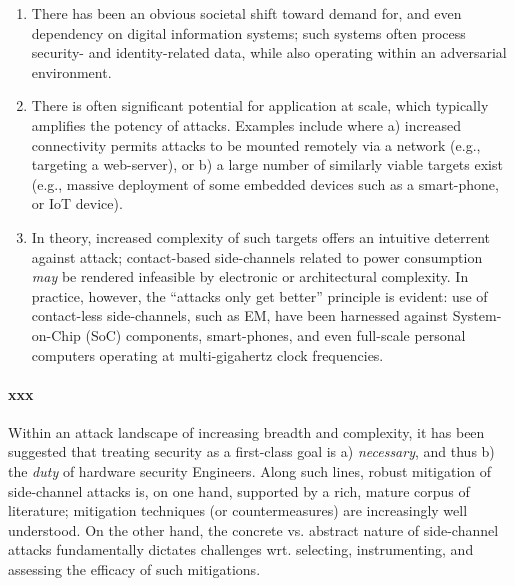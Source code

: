 \begin{enumerate}

\item There has been an obvious societal shift toward demand for, and even
      dependency on digital information systems; such systems often process
      security- and identity-related data, while also operating within an
      adversarial environment.

\item There is often significant potential for application at scale, which
      typically amplifies the potency of attacks.  Examples include where
      a) increased connectivity permits attacks to be mounted remotely via
         a network (e.g., targeting a web-server),
         or
      b) a large number of similarly viable targets exist (e.g., massive
         deployment of some embedded devices such as a smart-phone, or IoT
         device).

\item In   theory,
      increased complexity   of      such targets
      offers an intuitive deterrent against attack;
      contact-based side-channels related to power consumption {\em may} be
      rendered infeasible by electronic or architectural complexity.
      In practice,
      however, the ``attacks only get better'' principle is evident: use of
      contact-less side-channels, such as EM, have been harnessed against
      System-on-Chip (SoC) components, 
      smart-phones,
      and even
      full-scale personal computers
      operating at multi-gigahertz clock frequencies.

\end{enumerate}


\paragraph{xxx}

Within an attack landscape of increasing breadth and complexity, it has been
suggested that treating security as a first-class goal is
a) {\em necessary},
   and thus
b) the {\em duty} of hardware security Engineers.
Along such lines, robust mitigation of side-channel attacks is, on one hand,
supported by a rich, mature corpus of literature; mitigation techniques (or
countermeasures) are increasingly well understood.  On the other hand, the
concrete vs. abstract nature of side-channel attacks fundamentally dictates
challenges wrt. selecting, instrumenting, and assessing the efficacy of such
mitigations.

